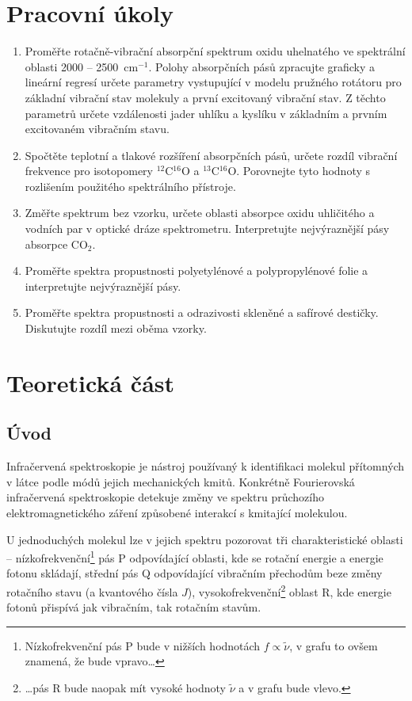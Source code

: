 \documentclass[10pt,a4paper]{article}
\renewcommand{\U}[1]{\ensuremath{\,\mathrm{#1}}}
\newcommand{\°}{\degree}
\begin{document}


\section{Pracovní úkoly}
\begin{enumerate}
    \item Proměřte rotačně-vibrační absorpční spektrum oxidu uhelnatého ve spektrální oblasti 2000 – 2500 $\U{cm^{-1}}$. Polohy absorpčních pásů zpracujte graficky a lineární regresí určete parametry vystupující v modelu pružného rotátoru pro základní vibrační stav molekuly a první excitovaný vibrační stav. Z těchto parametrů určete vzdálenosti jader uhlíku a kyslíku v základním a prvním excitovaném vibračním stavu.
    \item Spočtěte teplotní a tlakové rozšíření absorpčních pásů, určete rozdíl vibrační frekvence pro isotopomery $^{12}$C$^{16}$O a $^{13}$C$^{16}$O. Porovnejte tyto hodnoty s rozlišením použitého spektrálního přístroje.
    \item Změřte spektrum bez vzorku, určete oblasti absorpce oxidu uhličitého a vodních par v optické dráze spektrometru. Interpretujte nejvýraznější pásy absorpce CO$_2$.
    \item Proměřte spektra propustnosti polyetylénové a polypropylénové folie a interpretujte nejvýraznější pásy.
    \item Proměřte spektra propustnosti a odrazivosti skleněné a safírové destičky. Diskutujte rozdíl mezi oběma vzorky.
\end{enumerate}


\section{Teoretická část}

\subsection{Úvod}

Infračervená spektroskopie je nástroj používaný k identifikaci molekul přítomných v látce podle módů jejich mechanických kmitů. Konkrétně Fourierovská infračervená spektroskopie detekuje změny ve spektru průchozího elektromagnetického záření způsobené interakcí s kmitající molekulou.

U jednoduchých molekul lze v jejich spektru pozorovat tři charakteristické oblasti –
nízkofrekvenční\footnote{Nízkofrekvenční pás P bude v nižších hodnotách $f \propto \tilde{\nu}$, v grafu to ovšem znamená, že bude vpravo\dots} pás P odpovídající oblasti, kde se rotační energie a energie fotonu skládají, střední pás Q odpovídající vibračním přechodům beze změny rotačního stavu (a kvantového čísla $J$), vysokofrekvenční\footnote{\dots pás R bude naopak mít vysoké hodnoty $\tilde\nu$ a v grafu bude vlevo.} oblast R, kde energie fotonů přispívá jak vibračním, tak rotačním stavům. \cite{studijni-text}
\end{document}
